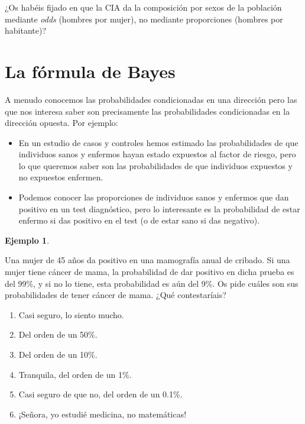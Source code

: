 \documentclass[
]{book}
\theoremstyle{definition}
\theoremstyle{definition}
\newtheorem{example}{Ejemplo}[chapter]
\theoremstyle{definition}
\theoremstyle{definition}
\theoremstyle{remark}
\begin{document}
\begin{rmdcaution}
¿Os habéis fijado en que la CIA da la composición por sexos de la población mediante \emph{odds} (hombres por mujer), no mediante proporciones (hombres por habitante)?
\end{rmdcaution}

\hypertarget{la-fuxf3rmula-de-bayes}{%
\section{La fórmula de Bayes}\label{la-fuxf3rmula-de-bayes}}

A menudo conocemos las probabilidades condicionadas en una dirección pero las que nos interesa saber son precisamente las probabilidades condicionadas en la dirección opuesta. Por ejemplo:

\begin{itemize}
\item
  En un estudio de casos y controles hemos estimado las probabilidades de que individuos sanos y enfermos hayan estado expuestos al factor de riesgo, pero lo que queremos saber son las probabilidades de que individuos expuestos y no expuestos enfermen.
\item
  Podemos conocer las proporciones de individuos sanos y enfermos que dan positivo en un test diagnóstico, pero lo interesante es la probabilidad de estar enfermo si das positivo en el test (o de estar sano si das negativo).
\end{itemize}

\begin{example}
\protect\hypertarget{exm:cancerpitpres}{}\label{exm:cancerpitpres}

Una mujer de 45 años da positivo en una mamografía anual de cribado. Si una mujer tiene cáncer de mama, la probabilidad de dar positivo en dicha prueba es del 99\%, y si no lo tiene, esta probabilidad es aún del 9\%. Os pide cuáles son sus probabilidades de tener cáncer de mama. ¿Qué contestaríais?

\begin{enumerate}
\def\labelenumi{\alph{enumi}.}
\item
  Casi seguro, lo siento mucho.
\item
  Del orden de un 50\%.
\item
  Del orden de un 10\%.
\item
  Tranquila, del orden de un 1\%.
\item
  Casi seguro de que no, del orden de un 0.1\%.
\item
  ¡Señora, yo estudié medicina, no matemáticas!
\end{enumerate}

\end{example}
\end{document}
